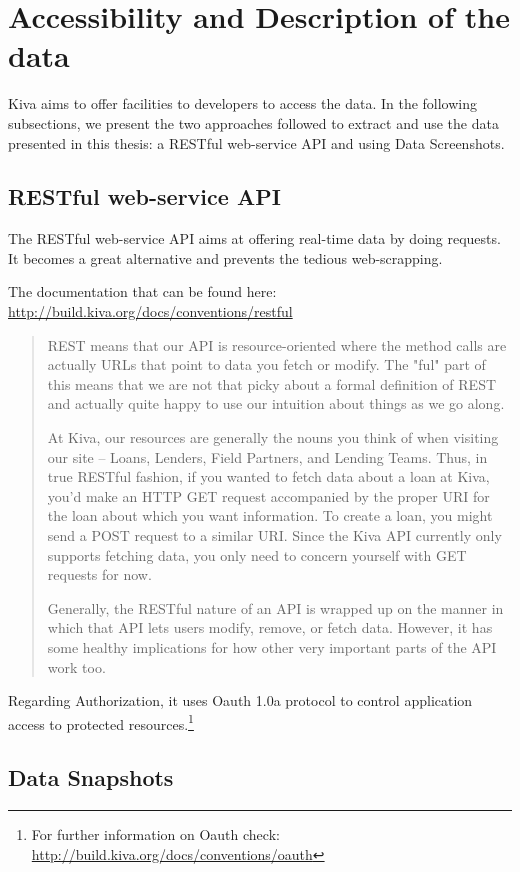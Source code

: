 \section{Accessibility and Description of the data}

Kiva aims to offer facilities to developers to access the data.
In the following subsections, we present the two approaches followed to extract and use the data presented in this thesis: a RESTful web-service API and using Data Screenshots.


\subsection{RESTful web-service API}
The RESTful web-service API aims at offering real-time data by doing requests. It becomes a great alternative and prevents the tedious web-scrapping.

The documentation that can be found  here: \url{http://build.kiva.org/docs/conventions/restful}

\blockquote{
REST means that our API is resource-oriented where the method calls are actually URLs that point to data you fetch or modify. The "ful" part of this means that we are not that picky about a formal definition of REST and actually quite happy to use our intuition about things as we go along.

At Kiva, our resources are generally the nouns you think of when visiting our site – Loans, Lenders, Field Partners, and Lending Teams. Thus, in true RESTful fashion, if you wanted to fetch data about a loan at Kiva, you'd make an HTTP GET request accompanied by the proper URI for the loan about which you want information. To create a loan, you might send a POST request to a similar URI. Since the Kiva API currently only supports fetching data, you only need to concern yourself with GET requests for now.  

Generally, the RESTful nature of an API is wrapped up on the manner in which that API lets users modify, remove, or fetch data. However, it has some healthy implications for how other very important parts of the API work too.}

Regarding Authorization, it uses Oauth 1.0a protocol to control application access to protected resources.\footnote{ For further information on Oauth check: \url{http://build.kiva.org/docs/conventions/oauth}}


\subsection{Data Snapshots}

